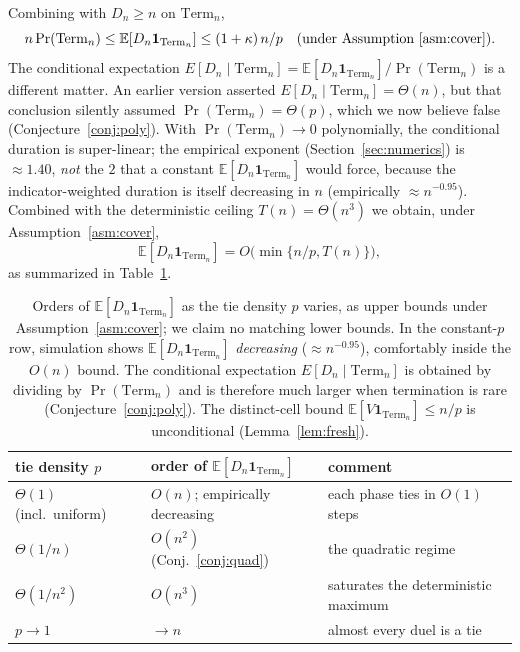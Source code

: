 \documentclass[11pt]{article}
\theoremstyle{definition}
\theoremstyle{remark}
\newcommand{\Term}{\mathrm{Term}}
\newcommand{\E}{\mathbb{E}}
\begin{document}
Combining with $D_n \ge n$ on $\Term_n$,
\[
n \Pr(\Term_n) \le \E[D_n \mathbf 1_{\Term_n}] \le (1 + \kappa)\,n/p \quad \text{(under Assumption~\ref{asm:cover})}.
\]
The conditional expectation $E[D_n \mid \Term_n] = \E[D_n \mathbf 1_{\Term_n}] / \Pr(\Term_n)$ is a different matter. An
earlier version asserted $E[D_n \mid \Term_n] = \Theta(n)$, but that conclusion silently assumed $\Pr(\Term_n) = \Theta(p)$,
which we now believe false (Conjecture~\ref{conj:poly}). With $\Pr(\Term_n) \to 0$ polynomially, the conditional duration is
super-linear; the empirical exponent (Section~\ref{sec:numerics}) is $\approx 1.40$, \emph{not} the $2$ that a constant
$\E[D_n\mathbf 1_{\Term_n}]$ would force, because the indicator-weighted duration is itself decreasing in $n$
(empirically $\approx n^{-0.95}$). Combined with the deterministic ceiling $T(n) = \Theta(n^3)$ we obtain, under
Assumption~\ref{asm:cover},
\begin{equation}\label{eq:interp}
\E[D_n \mathbf 1_{\Term_n}] = O\!\bigl(\min\{n/p, T(n)\}\bigr),
\end{equation}
as summarized in Table~\ref{tab:orders}.

\begin{table}[t]
\centering
\begin{tabular}{lll}
\toprule
tie density $p$ & order of $\E[D_n \mathbf 1_{\Term_n}]$ & comment\\
\midrule
$\Theta(1)$ (incl.\ uniform) & $O(n)$; empirically decreasing & each phase ties in $O(1)$ steps\\
$\Theta(1/n)$ & $O(n^2)$ (Conj.~\ref{conj:quad}) & the quadratic regime\\
$\Theta(1/n^2)$ & $O(n^3)$ & saturates the deterministic maximum\\
$p \to 1$ & $\to n$ & almost every duel is a tie\\
\bottomrule
\end{tabular}
\caption{Orders of $\E[D_n \mathbf 1_{\Term_n}]$ as the tie density $p$ varies, as upper bounds under
Assumption~\ref{asm:cover}; we claim no matching lower bounds. In the constant-$p$ row, simulation shows
$\E[D_n \mathbf 1_{\Term_n}]$ \emph{decreasing} ($\approx n^{-0.95}$), comfortably inside the $O(n)$ bound. The conditional
expectation $E[D_n \mid \Term_n]$ is obtained by dividing by $\Pr(\Term_n)$ and is therefore much larger when termination is
rare (Conjecture~\ref{conj:poly}). The distinct-cell bound $\E[V \mathbf 1_{\Term_n}] \le n/p$ is unconditional
(Lemma~\ref{lem:fresh}).}
\label{tab:orders}
\end{table}
\end{document}
